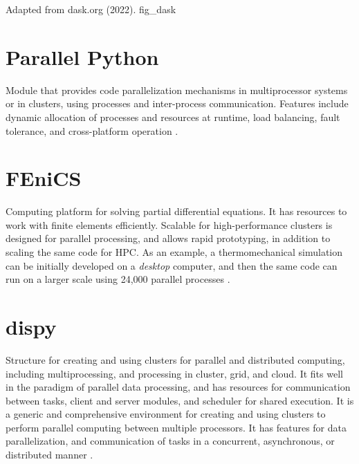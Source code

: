  {Adapted from dask.org (2022).} {fig_dask}




\section{Parallel Python}

Module that provides code parallelization mechanisms in multiprocessor systems or in clusters, using processes and inter-process communication. Features include dynamic allocation of processes and resources at runtime, load balancing, fault tolerance, and cross-platform operation \cite{Palach2014}.




\section{FEniCS}

Computing platform for solving partial differential equations. It has resources to work with finite elements efficiently. Scalable for high-performance clusters is designed for parallel processing, and allows rapid prototyping, in addition to scaling the same code for HPC. As an example, a thermomechanical simulation can be initially developed on a \textit{desktop} computer, and then the same code can run on a larger scale using 24,000 parallel processes \cite{Alnaes2015}.




\section{dispy}

Structure for creating and using clusters for parallel and distributed computing, including multiprocessing, and processing in cluster, grid, and cloud. It fits well in the paradigm of parallel data processing, and has resources for communication between tasks, client and server modules, and scheduler for shared execution. It is a generic and comprehensive environment for creating and using clusters to perform parallel computing between multiple processors. It has features for data parallelization, and communication of tasks in a concurrent, asynchronous, or distributed manner \cite{Agius2019}.




